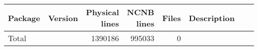 \begin{tabular}{|l|r|r|r|r|r|r|r|}\hline
Package & Version & Physical lines & NCNB lines & Files & Description\\\hline
Total &   & 1390186 & 995033 & 0 &  \\\hline
\end{tabular}

